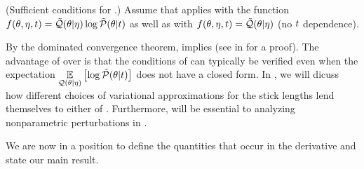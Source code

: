 %
\begin{assu}
(Sufficient conditions for .)
%
Assume that  applies with the function $f(\theta,
\eta, t) = \tilde{\mathcal{Q}}(\theta \vert \eta) \log \tilde{\mathcal{P}}(\theta \vert t)$ as well as
with $f(\theta, \eta, t) = \tilde{\mathcal{Q}}(\theta \vert \eta)$ (no $t$ dependence).
%
\end{assu}

By the dominated convergence theorem,  implies
 (see  in  for a
proof). The advantage of  over
 is that the conditions of 
can typically be verified even when the expectation $\underset{\mathcal{Q}(\theta \vert
\eta)}{\mathbb{E}}\left[\log \tilde{\mathcal{P}}(\theta \vert t)\right]$ does not have a closed form.  In
, we will dicuss how different choices of
variational approximations for the stick lengths lend themselves to either
 of .  Furthermore,
 will be essential to analyzing nonparametric
perturbations in .

We are now in a position to define the quantities that occur in the derivative
and state our main result.


